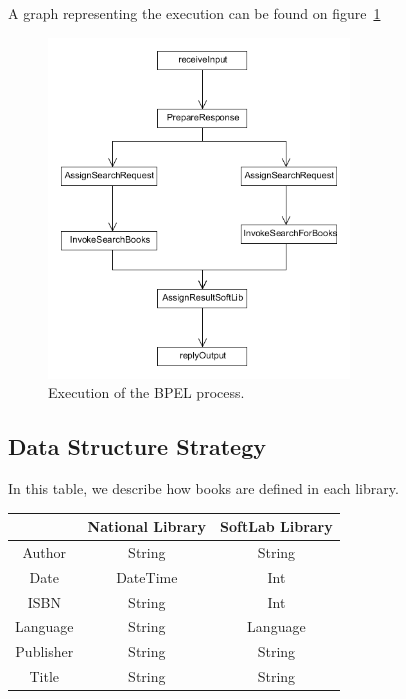 \documentclass[a4paper,10pt]{article}
\begin{document}
A graph representing the execution can be found on figure~\ref{fig:graph_seq}

 \begin{figure}[h]
	 \centering
 \includegraphics[width=8cm]{diagsequence.png}
 \caption{Execution of the BPEL process.}
 \label{fig:graph_seq}
\end{figure}




\subsection{Data Structure Strategy}
In this table, we describe how books are defined in each library. \\

\begin{center}
\begin{tabular}{|c|c|c|}
\hline
  & National Library & SoftLab Library \\
  \hline
  Author & String & String \\
  \hline
  Date & DateTime & Int \\
  \hline
  ISBN & String & Int \\
  \hline
  Language & String & Language \\
  \hline
  Publisher & String & String \\
  \hline
  Title & String & String \\
  \hline
\end{tabular}
\end{center}
\vspace{0.8cm}
\end{document}
